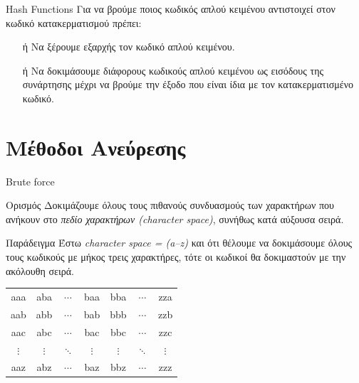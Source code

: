 \documentclass[10pt]{beamer}
\newenvironment{alltt}{\ttfamily}{\rmfamily}
\begin{document}
\begin{frame}{Hash Functions}
    Για να βρούμε ποιος κωδικός απλού κειμένου αντιστοιχεί στον κωδικό κατακερματισμού πρέπει:
    \pause

    \begin{itemize}
        \item[ή] Να ξέρουμε εξαρχής τον κωδικό απλού κειμένου.
        \pause
        \item[ή] Nα δοκιμάσουμε διάφορους κωδικούς απλού κειμένου ως εισόδους της συνάρτησης μέχρι να βρούμε την έξοδο που είναι ίδια με τον κατακερματισμένο κωδικό.
    \end{itemize}
\end{frame}

\section{Μέθοδοι Ανεύρεσης}
\begin{frame}{Brute force}
    \begin{block}{Ορισμός}
        Δοκιμάζουμε όλους τους πιθανούς συνδυασμούς των χαρακτήρων που ανήκουν στο \textit{πεδίο χαρακτήρων (character space)}, συνήθως κατά αύξουσα σειρά.
    \end{block}
    \pause
    \begin{block}{Παράδειγμα}
        Έστω \textit{character space = (a--z)} και ότι θέλουμε να δοκιμάσουμε όλους τους κωδικούς με μήκος τρεις χαρακτήρες, τότε οι κωδικοί θα δοκιμαστούν με την ακόλουθη σειρά.
        \begin{table}[h]
            \centering
            \begin{alltt}
                \begin{tabular}{ccccccc}
                    aaa & aba & $\cdots$ & baa & bba & $\cdots$ & zza \\
                    aab & abb & $\cdots$ & bab & bbb & $\cdots$ & zzb \\
                    aac & abc & $\cdots$ & bac & bbc & $\cdots$ & zzc \\
                    $\vdots$ & $\vdots$ & $\ddots$ & $\vdots$ & $\vdots$ & $\ddots$ & $\vdots$ \\
                    aaz & abz & $\cdots$ & baz & bbz & $\cdots$ & zzz \\
                \end{tabular}
            \end{alltt}
        \end{table}
    \end{block}
\end{frame}
\end{document}
